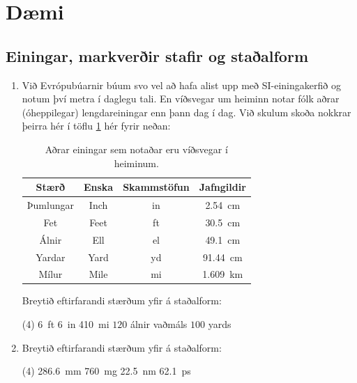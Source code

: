 \section{Dæmi}


\subsection*{Einingar, markverðir stafir og staðalform}

\begin{enumerate}[label = \textbf{Dæmi \thechapter.\arabic*.}]

\item Við Evrópubúarnir búum svo vel að hafa alist upp með SI-einingakerfið og notum því metra í daglegu tali. En víðsvegar um heiminn notar fólk aðrar (óheppilegar) lengdareiningar enn þann dag í dag. Við skulum skoða nokkrar þeirra hér í töflu \ref{tafla:einingakerfi2} hér fyrir neðan:

\begin{table}[H]
    \centering
\begin{tabular}{|c|c|c|c|}
\hline

\textbf{Stærð} & \textbf{Enska} &  \textbf{Skammstöfun} & \textbf{Jafngildir} \\
\hline
Þumlungar & Inch & in & \SI{2.54}{cm} \\
Fet & Feet & ft & \SI{30.5}{cm} \\
Álnir & Ell  & el & \SI{49.1}{cm} \\
Yardar & Yard  & yd & \SI{91.44}{cm} \\
Mílur & Mile & mi & \SI{1.609}{km}  \\
\hline
\end{tabular}
\caption{Aðrar einingar sem notaðar eru víðsvegar í heiminum.}
\label{tafla:einingakerfi2}
\end{table}
\vspace{-0.4cm}
Breytið eftirfarandi stærðum yfir á staðalform:

    \begin{tasks}[label = {(\alph*)}, label-format={\bfseries}, label-offset = {0.4cm}](4)
          \task \SI{6}{ft} \SI{6}{in}
          \task \SI{410}{mi}
          \task $120$ álnir vaðmáls
          \task $100$ yards
    \end{tasks}
    
\item Breytið eftirfarandi stærðum yfir á staðalform:

    \begin{tasks}[label = {(\alph*)}, label-format={\bfseries}, label-offset = {0.4cm}](4)
          \task \SI{286.6}{mm}
          \task \SI{760}{mg}
          \task \SI{22.5}{nm}
          \task \SI{62.1}{ps}
    \end{tasks}


\end{enumerate}
